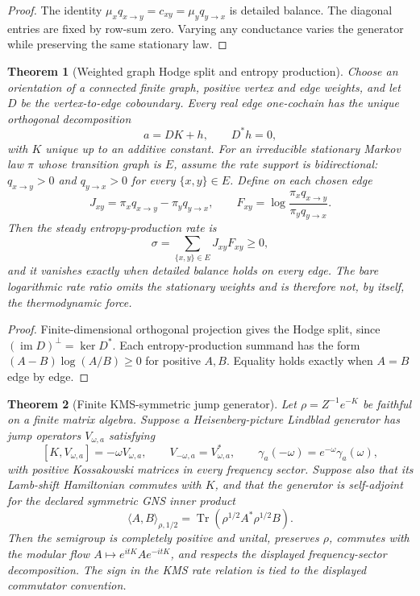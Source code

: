 \documentclass[11pt]{article}
\newtheorem{theorem}{Theorem}[section]
\theoremstyle{remark}
\theoremstyle{plain}
\begin{document}
\begin{proof}
The identity \(\mu_xq_{x\to y}=c_{xy}=\mu_yq_{y\to x}\) is detailed balance.  The diagonal
entries are fixed by row-sum zero.  Varying any conductance varies the generator while preserving
the same stationary law.
\end{proof}

\begin{theorem}[Weighted graph Hodge split and entropy production]
\label{thm:weighted-hodge-entropy}
Choose an orientation of a connected finite graph, positive vertex and edge weights, and let
\(D\) be the vertex-to-edge coboundary.  Every real edge one-cochain has the unique orthogonal
decomposition
\[
 a=DK+h,
 \qquad D^{*}h=0,
\]
with \(K\) unique up to an additive constant.  For an irreducible stationary Markov law \(\pi\)
whose transition graph is \(E\), assume the rate support is bidirectional:
\(q_{x\to y}>0\) and \(q_{y\to x}>0\) for every \(\{x,y\}\in E\).  Define on each chosen edge
\[
 J_{xy}=\pi_xq_{x\to y}-\pi_yq_{y\to x},
 \qquad
 F_{xy}=\log\frac{\pi_xq_{x\to y}}{\pi_yq_{y\to x}} .
\]
Then the steady entropy-production rate is
\[
 \sigma=\sum_{\{x,y\}\in E}J_{xy}F_{xy}\ge 0,
\]
and it vanishes exactly when detailed balance holds on every edge.  The bare logarithmic rate
ratio omits the stationary weights and is therefore not, by itself, the thermodynamic force.
\end{theorem}

\begin{proof}
Finite-dimensional orthogonal projection gives the Hodge split, since
\((\operatorname{im}D)^{\perp}=\ker D^{*}\).  Each entropy-production summand has the form
\((A-B)\log(A/B)\ge0\) for positive \(A,B\).  Equality holds exactly when \(A=B\) edge by edge.
\end{proof}

\begin{theorem}[Finite KMS-symmetric jump generator]
\label{thm:finite-kms-jump-generator}
Let \(\rho=Z^{-1}e^{-K}\) be faithful on a finite matrix algebra.  Suppose a Heisenberg-picture
Lindblad generator has jump operators \(V_{\omega,a}\) satisfying
\[
 [K,V_{\omega,a}]=-\omega V_{\omega,a},
 \qquad V_{-\omega,a}=V_{\omega,a}^{*},
 \qquad \gamma_a(-\omega)=e^{-\omega}\gamma_a(\omega),
\]
with positive Kossakowski matrices in every frequency sector.  Suppose also that its Lamb-shift
Hamiltonian commutes with \(K\), and that the generator is self-adjoint for the declared symmetric
GNS inner product
\[
 \langle A,B\rangle_{\rho,1/2}
 =\operatorname{Tr}(\rho^{1/2}A^{*}\rho^{1/2}B).
\]
Then the semigroup is completely positive and unital, preserves \(\rho\), commutes with the modular
flow \(A\mapsto e^{itK}Ae^{-itK}\), and respects the displayed frequency-sector decomposition.
The sign in the KMS rate relation is tied to the displayed commutator convention.
\end{theorem}
\end{document}
